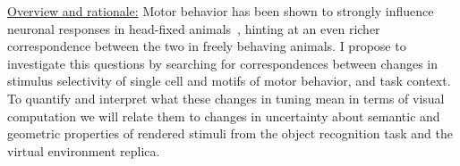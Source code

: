 \documentclass[COG,11pt]{ercgrant}
\begin{document}
\underline{Overview and rationale:} 
Motor behavior has been shown to strongly influence neuronal responses in head-fixed animals~\parencite{Chiappe2010-bm, Bezdudnaya2006-ge, Andermann2011-vw, Treue1996-lp,Franke2022-do, Musall2019-kd}, hinting at an even richer correspondence between the two in freely behaving animals. 
I propose to investigate this questions by searching for correspondences between changes in stimulus selectivity of single cell and motifs of motor behavior, and task context.
To quantify and interpret what these changes in tuning mean in terms of visual computation we will relate them to changes in uncertainty about semantic and geometric properties of rendered stimuli from the object recognition task and the virtual environment replica.
\end{document}
